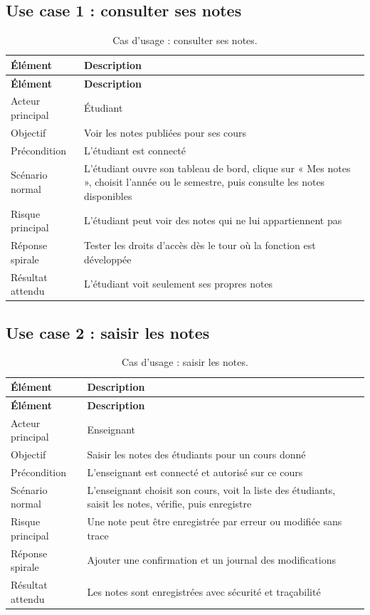\documentclass[12pt,a4paper]{article}
\begin{document}
\subsection{Use case 1 : consulter ses notes}

\begin{longtable}{p{} p{}}
\caption{Cas d'usage : consulter ses notes.}\\
\toprule
\textbf{Élément} & \textbf{Description} \\
\midrule
\endfirsthead
\toprule
\textbf{Élément} & \textbf{Description} \\
\midrule
\endhead
Acteur principal & Étudiant \\
Objectif & Voir les notes publiées pour ses cours \\
Précondition & L'étudiant est connecté \\
Scénario normal & L'étudiant ouvre son tableau de bord, clique sur « Mes notes », choisit l'année ou le semestre, puis consulte les notes disponibles \\
Risque principal & L'étudiant peut voir des notes qui ne lui appartiennent pas \\
Réponse spirale & Tester les droits d'accès dès le tour où la fonction est développée \\
Résultat attendu & L'étudiant voit seulement ses propres notes \\
\bottomrule
\end{longtable}

\subsection{Use case 2 : saisir les notes}

\begin{longtable}{p{} p{}}
\caption{Cas d'usage : saisir les notes.}\\
\toprule
\textbf{Élément} & \textbf{Description} \\
\midrule
\endfirsthead
\toprule
\textbf{Élément} & \textbf{Description} \\
\midrule
\endhead
Acteur principal & Enseignant \\
Objectif & Saisir les notes des étudiants pour un cours donné \\
Précondition & L'enseignant est connecté et autorisé sur ce cours \\
Scénario normal & L'enseignant choisit son cours, voit la liste des étudiants, saisit les notes, vérifie, puis enregistre \\
Risque principal & Une note peut être enregistrée par erreur ou modifiée sans trace \\
Réponse spirale & Ajouter une confirmation et un journal des modifications \\
Résultat attendu & Les notes sont enregistrées avec sécurité et traçabilité \\
\bottomrule
\end{longtable}
\end{document}
